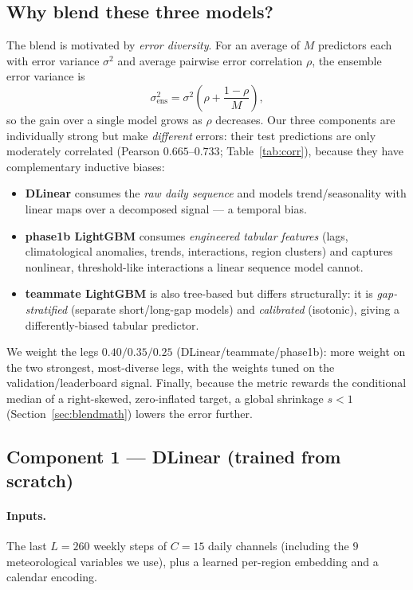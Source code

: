 \documentclass[11pt]{article}
\begin{document}
\subsection{Why blend these three models?}
\label{sec:why}
The blend is motivated by \emph{error diversity}. For an average of $M$ predictors each with error
variance $\sigma^2$ and average pairwise error correlation $\rho$, the ensemble error variance is
\begin{equation}
\sigma^2_{\text{ens}}=\sigma^2\!\left(\rho+\frac{1-\rho}{M}\right),
\label{eq:ensvar}
\end{equation}
so the gain over a single model grows as $\rho$ decreases. Our three components are individually
strong but make \emph{different} errors: their test predictions are only moderately correlated
(Pearson $0.665$--$0.733$; Table~\ref{tab:corr}), because they have complementary inductive biases:
\begin{itemize}
  \item \textbf{DLinear} consumes the \emph{raw daily sequence} and models trend/seasonality with
        linear maps over a decomposed signal --- a temporal bias.
  \item \textbf{phase1b LightGBM} consumes \emph{engineered tabular features} (lags, climatological
        anomalies, trends, interactions, region clusters) and captures nonlinear, threshold-like
        interactions a linear sequence model cannot.
  \item \textbf{teammate LightGBM} is also tree-based but differs structurally: it is
        \emph{gap-stratified} (separate short/long-gap models) and \emph{calibrated} (isotonic),
        giving a differently-biased tabular predictor.
\end{itemize}
We weight the legs $0.40/0.35/0.25$ (DLinear/teammate/phase1b): more weight on the two strongest,
most-diverse legs, with the weights tuned on the validation/leaderboard signal. Finally, because
the metric rewards the conditional median of a right-skewed, zero-inflated target, a global
shrinkage $s<1$ (Section~\ref{sec:blendmath}) lowers the error further.

\subsection{Component 1 --- DLinear (trained from scratch)}
\paragraph{Inputs.} The last $L=260$ weekly steps of $C=15$ daily channels (including the $9$
meteorological variables we use), plus a learned per-region embedding and a calendar encoding.
\end{document}
